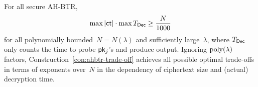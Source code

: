 \begin{corollary}\label{cor:lower-bound}
For all secure AH-BTR,
\begin{align*}
\max{|\ct|}\cdot\max{\TDec}\geq\frac{N}{1000}
\end{align*}
for all polynomially bounded~${N=N(\lambda)}$ and sufficiently large~$\lambda$,
where $\TDec$ only counts the time to probe $\pk_j$'s and produce output.
Ignoring $\operatorname{poly}(\lambda)$ factors,
Construction~\ref{con:ahbtr-trade-off} achieves all possible optimal trade-offs
in terms of exponents over~$N$ in the dependency of ciphertext size and (actual) decryption time.
\end{corollary}

